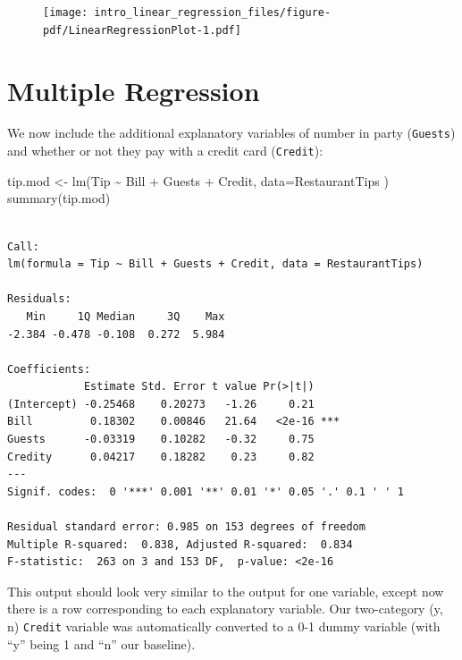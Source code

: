 \documentclass[
  letterpaper,
  DIV=11,
  numbers=noendperiod]{scrreprt}
\newenvironment{Shaded}{\begin{snugshade}}{\end{snugshade}}
\newcommand{\AttributeTok}[1]{\textcolor[rgb]{0.49,0.56,0.16}{#1}}
\newcommand{\FunctionTok}[1]{\textcolor[rgb]{0.02,0.16,0.49}{#1}}
\newcommand{\NormalTok}[1]{\textcolor[rgb]{0.00,0.44,0.13}{#1}}
\newcommand{\OtherTok}[1]{\textcolor[rgb]{0.00,0.44,0.13}{#1}}
\newcommand{\SpecialCharTok}[1]{\textcolor[rgb]{0.25,0.44,0.63}{#1}}
\begin{document}
\begin{figure}[H]

{\centering \texttt{[image: intro\_linear\_regression\_files/figure-pdf/LinearRegressionPlot-1.pdf]}

}

\end{figure}

\hypertarget{multiple-regression}{%
\section{Multiple Regression}\label{multiple-regression}}

We now include the additional explanatory variables of number in party
(\texttt{Guests}) and whether or not they pay with a credit card
(\texttt{Credit}):

\begin{Shaded}
\begin{Highlighting}[]
\NormalTok{tip.mod }\OtherTok{\textless{}{-}} \FunctionTok{lm}\NormalTok{(Tip }\SpecialCharTok{\textasciitilde{}}\NormalTok{ Bill }\SpecialCharTok{+}\NormalTok{ Guests }\SpecialCharTok{+}\NormalTok{ Credit, }\AttributeTok{data=}\NormalTok{RestaurantTips )}
\FunctionTok{summary}\NormalTok{(tip.mod)}
\end{Highlighting}
\end{Shaded}

\begin{verbatim}

Call:
lm(formula = Tip ~ Bill + Guests + Credit, data = RestaurantTips)

Residuals:
   Min     1Q Median     3Q    Max 
-2.384 -0.478 -0.108  0.272  5.984 

Coefficients:
            Estimate Std. Error t value Pr(>|t|)    
(Intercept) -0.25468    0.20273   -1.26     0.21    
Bill         0.18302    0.00846   21.64   <2e-16 ***
Guests      -0.03319    0.10282   -0.32     0.75    
Credity      0.04217    0.18282    0.23     0.82    
---
Signif. codes:  0 '***' 0.001 '**' 0.01 '*' 0.05 '.' 0.1 ' ' 1

Residual standard error: 0.985 on 153 degrees of freedom
Multiple R-squared:  0.838, Adjusted R-squared:  0.834 
F-statistic:  263 on 3 and 153 DF,  p-value: <2e-16
\end{verbatim}

This output should look very similar to the output for one variable,
except now there is a row corresponding to each explanatory variable.
Our two-category (y, n) \texttt{Credit} variable was automatically
converted to a 0-1 dummy variable (with ``y'' being 1 and ``n'' our
baseline).
\end{document}

